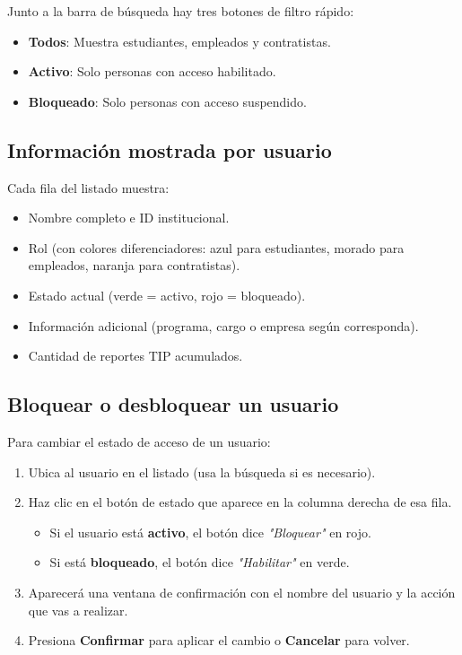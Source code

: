 \documentclass[12pt, a4paper]{article}
\begin{document}
Junto a la barra de búsqueda hay tres botones de filtro rápido:

\begin{itemize}
  \item \textbf{Todos}: Muestra estudiantes, empleados y contratistas.
  \item \textbf{Activo}: Solo personas con acceso habilitado.
  \item \textbf{Bloqueado}: Solo personas con acceso suspendido.
\end{itemize}

\subsection{Información mostrada por usuario}

Cada fila del listado muestra:
\begin{itemize}
  \item Nombre completo e ID institucional.
  \item Rol (con colores diferenciadores: azul para estudiantes,
        morado para empleados, naranja para contratistas).
  \item Estado actual (verde = activo, rojo = bloqueado).
  \item Información adicional (programa, cargo o empresa según corresponda).
  \item Cantidad de reportes TIP acumulados.
\end{itemize}

\subsection{Bloquear o desbloquear un usuario}

Para cambiar el estado de acceso de un usuario:

\begin{enumerate}
  \item Ubica al usuario en el listado (usa la búsqueda si es necesario).
  \item Haz clic en el botón de estado que aparece en la columna derecha
        de esa fila.
        \begin{itemize}
          \item Si el usuario está \textbf{activo}, el botón dice
                \emph{"Bloquear"} en rojo.
          \item Si está \textbf{bloqueado}, el botón dice
                \emph{"Habilitar"} en verde.
        \end{itemize}
  \item Aparecerá una ventana de confirmación con el nombre del usuario
        y la acción que vas a realizar.
  \item Presiona \textbf{Confirmar} para aplicar el cambio o
        \textbf{Cancelar} para volver.
\end{enumerate}
\end{document}
